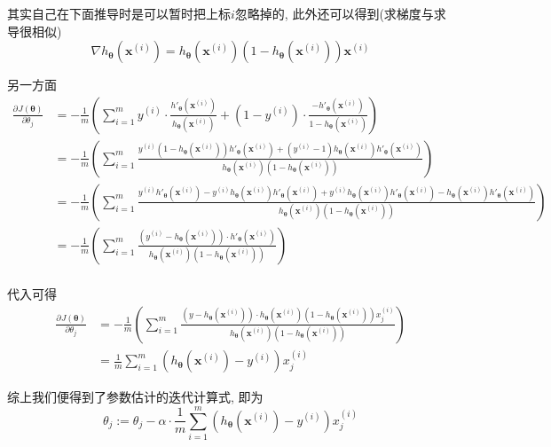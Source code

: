 \documentclass[a4paper,UTF8]{ctexart}
\theoremstyle{plain} \newtheorem{theorem}{定理}[section]
\theoremstyle{plain} \newtheorem{definition}{定义}[section]
\theoremstyle{plain} \newtheorem{lemma}{引理}[section]
\theoremstyle{plain} \newtheorem{proposition}{命题}[section]
\theoremstyle{plain} \newtheorem{example}{例}[section]
\theoremstyle{plain} \newtheorem{remark}{注}[section]
\theoremstyle{plain} \newtheorem{corollary}{推论}[section]
\newcommand{\p}[3]{\frac{\partial^{#1}#2}{\partial{#3}^{#1}}}  %
\begin{document}
其实自己在下面推导时是可以暂时把上标$i$忽略掉的, 此外还可以得到(求梯度与求导很相似)
\begin{equation*}
\nabla h_{\bm{\theta}}(\bm{x}^{(i)}) = h_{\bm{\theta}}(\bm{x}^{(i)}) (1 - h_{\bm{\theta}}(\bm{x}^{(i)})) \bm{x}^{(i)}
\end{equation*}

另一方面
\begin{align*}
\p{}{J(\bm{\theta})}{\theta_{j}} & = - \frac{1}{m} \left( \sum_{i=1}^{m} y^{(i)} \cdot \frac{h'_{\bm{\theta}}(\bm{x}^{(i)})}{h_{\bm{\theta}}(\bm{x}^{(i)})} + (1 - y^{(i)}) \cdot \frac{-h'_{\bm{\theta}}(\bm{x}^{(i)})}{1 - h_{\bm{\theta}}(\bm{x}^{(i)})} \right) \\
& = -\frac{1}{m} \left( \sum_{i=1}^{m} \frac{y^{(i)}(1 - h_{\bm{\theta}}(\bm{x}^{(i)})) h'_{\bm{\theta}}(\bm{x}^{(i)}) + (y^{(i)} - 1) h_{\bm{\theta}}(\bm{x}^{(i)}) h'_{\bm{\theta}}(\bm{x}^{(i)})}{h_{\bm{\theta}}(\bm{x}^{(i)}) (1 - h_{\bm{\theta}}(\bm{x}^{(i)}))}  \right) \\
& = - \frac{1}{m} \left( \sum_{i=1}^{m} \frac{y^{(i)} h'_{\bm{\theta}}(\bm{x}^{(i)}) - y^{(i)} h_{\bm{\theta}} (\bm{x}^{(i)}) h'_{\bm{\theta}}(\bm{x}^{(i)}) + y^{(i)} h_{\bm{\theta}}(\bm{x}^{(i)})h'_{\bm{\theta}} (\bm{x}^{(i)}) - h_{\bm{\theta}} (\bm{x}^{(i)}) h'_{\bm{\theta}}(\bm{x}^{(i)}) } {h_{\bm{\theta}}(\bm{x}^{(i)}) (1 - h_{\bm{\theta}} (\bm{x}^{(i)}))} \right) \\
& = - \frac{1}{m} \left( \sum_{i=1}^{m} \frac{(y^{(i)} - h_{\bm{\theta}}(\bm{x}^{(i)}) ) \cdot h'_{\bm{\theta}} (\bm{x}^{(i)})} {h_{\bm{\theta}} (\bm{x}^{(i)}) (1 - h_{\bm{\theta}} (\bm{x}^{(i)}))} \right) \\
\end{align*}

代入可得
\begin{align*}
\p{}{J(\bm{\theta})}{\theta_{j}} & = - \frac{1}{m} \left( \sum_{i=1}^{m} \frac{(y - h_{\bm{\theta}}(\bm{x}^{(i)})) \cdot h_{\bm{\theta}} (\bm{x}^{(i)}) (1 - h_{\bm{\theta}}(\bm{x}^{(i)}))x_{j}^{(i)} }{h_{\bm{\theta}} (\bm{x}^{(i)}) (1 - h_{\bm{\theta}}(\bm{x}^{(i)}))} \right) \\
& = \frac{1}{m} \sum_{i=1}^{m} (h_{\bm{\theta}}(\bm{x}^{(i)}) - y^{(i)}) x_{j}^{(i)}
\end{align*}

综上我们便得到了参数估计的迭代计算式, 即为
\begin{equation*}
\theta_{j} := \theta_{j} - \alpha \cdot \frac{1}{m} \sum_{i=1}^{m} (h_{\bm{\theta}}(\bm{x}^{(i)}) - y^{(i)}) x_{j}^{(i)}
\end{equation*}
\end{document}
